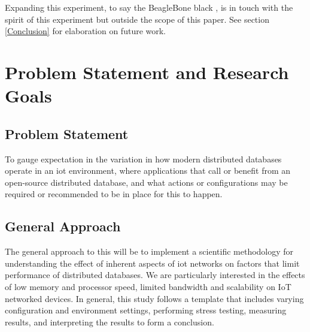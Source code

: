 Expanding this experiment, to say the BeagleBone black \cite{BeagleBoard.orgBlack}, is in touch with the spirit of this experiment but outside the scope of this paper.
See section \ref{Conclusion} for elaboration on future work.







\section{Problem Statement and Research Goals}

\subsection{Problem Statement}
To gauge expectation in the variation in how modern distributed databases operate in an \gls{iot} environment, where applications that call or benefit from an open-source distributed database, and what actions or configurations may be required or recommended to be in place for this to happen.
\subsection{General Approach}
The general approach to this will be to implement a scientific methodology for understanding the effect of inherent aspects of \gls{iot} networks on factors that limit performance of distributed databases. We are particularly interested in the effects of low memory and processor speed, limited bandwidth and scalability on IoT networked devices. In general, this study follows a template that includes varying configuration and environment settings, performing stress testing, measuring results, and interpreting the results to form a conclusion.                 
